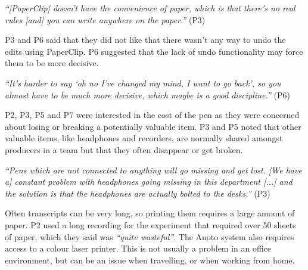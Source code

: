 \textit{``[PaperClip] doesn't have the convenience of paper, which is that there's no real rules [and] you can
write anywhere on the paper.''} (P3)




P3 and P6 said that they did not like that there wasn't any way to undo the edits using PaperClip. P6 suggested
that the lack of undo functionality may force them to be more decisive.

\textit{``It's harder to say `oh no I've changed my mind, I want to go back', so you almost have to be much more
decisive, which maybe is a good discipline.''} (P6)


P2, P3, P5 and P7 were interested in the cost of the pen as they were concerned about losing or breaking a potentially
valuable item.  P3 and P5 noted that other valuable items, like headphones and recorders, are normally shared amongst
producers in a team but that they often disappear or get broken.


\textit{``Pens which are not connected to anything will go missing and get lost.
  [We have a] constant problem with headphones going missing in this department [...]
and the solution is that the headphones are actually bolted to the desks.''} (P3)

Often transcripts can be very long, so printing them requires a large amount of paper. P2 used a long recording
for the experiment that required over 50 sheets of paper, which they said was \textit{``quite wasteful''}.
The Anoto system also requires access to a colour laser printer.
This is not usually a problem in an office environment, but can be an issue when travelling, or when
working from home.


